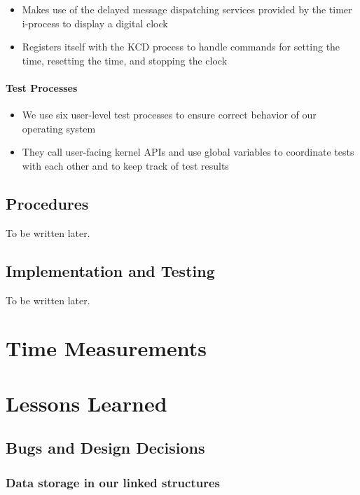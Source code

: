 \documentclass[12pt]{report}
\begin{document}
\begin{itemize}
    \item Makes use of the delayed message dispatching services provided by the timer i-process to display a digital clock
    \item Registers itself with the KCD process to handle commands for setting the time, resetting the time, and stopping the clock
\end{itemize}

\subsection{Test Processes}

\begin{itemize}
    \item We use six user-level test processes to ensure correct behavior of our operating system
    \item They call user-facing kernel APIs and use global variables to coordinate tests with each other and to keep track of test results
\end{itemize}

\chapter{Procedures}

To be written later.

\chapter{Implementation and Testing}

To be written later.

\part{Time Measurements}

\part{Lessons Learned}

\chapter{Bugs and Design Decisions}

\section{Data storage in our linked structures}
\end{document}
